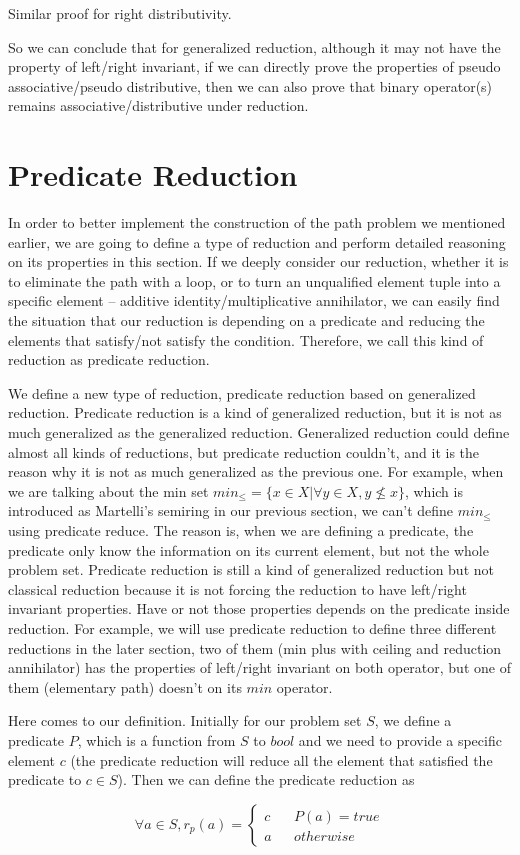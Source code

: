 \documentclass[a4paper,10pt]{article}
\newcommand{\e}[2]{
\begin{equation}
  \label{#1} 
  #2
\end{equation}
}
\begin{document}
Similar proof for right distributivity. 

So we can conclude that for generalized reduction, although it may not have the property of left/right invariant, if we can directly prove the properties of pseudo associative/pseudo distributive, then we can also prove that binary operator(s) remains associative/distributive under reduction.

\section{Predicate Reduction}
In order to better implement the construction of the path problem we mentioned earlier, we are going to define a type of reduction and perform detailed reasoning on its properties in this section. 
If we deeply consider our reduction, whether it is to eliminate the path with a loop, or to turn an unqualified element tuple into a specific element -- additive identity/multiplicative annihilator, we can easily find the situation that our reduction is depending on a predicate and reducing the elements that satisfy/not satisfy the condition. Therefore, we call this kind of reduction as predicate reduction.

We define a new type of reduction, predicate reduction based on generalized reduction. 
Predicate reduction is a kind of generalized reduction, but it is not as much generalized as the generalized reduction. Generalized reduction could define almost all kinds of reductions, but predicate reduction couldn't, and it is the reason why it is not as much generalized as the previous one. For example, when we are talking about the min set $min_\leq = \{ x \in X | \forall y \in X, y \not\leq x \}$, which is introduced as Martelli’s semiring in our previous section, we can't define $min_\leq$ using predicate reduce. The reason is, when we are defining a predicate, the predicate only know the information on its current element, but not the whole problem set. Predicate reduction is still a kind of generalized reduction but not classical reduction because it is not forcing the reduction to have left/right invariant properties. Have or not those properties depends on the predicate inside reduction. For example, we will use predicate reduction to define three different reductions in the later section, two of them (min plus with ceiling and reduction annihilator) has the properties of left/right invariant on both operator, but one of them (elementary path) doesn't on its $min$ operator.

Here comes to our definition. Initially for our problem set $S$, we define a predicate $P$, which is a function from $S$ to $bool$ and we need to provide a specific element $c$ (the predicate reduction will reduce all the element that satisfied the predicate to $c \in S$). Then we can define the predicate reduction as 
\e{pr:def:def}{\forall a \in S,  r_p(a)=\left\{
\begin{aligned}
c &  & P(a) = true \\
a &  & otherwise 
\end{aligned}
\right.}
\end{document}

